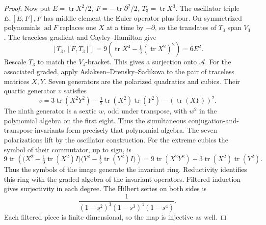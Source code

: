\documentclass[11pt,a4paper]{article}
\theoremstyle{definition}
\begin{document}
\begin{proof}
Now put \(E=\operatorname{tr}X^2/2,\ F=-\operatorname{tr}\partial^2/2,\
T_3=\operatorname{tr}X^3\). The oscillator triple \(E,[E,F],F\) has middle element the Euler operator plus four. On symmetrized polynomials \(\operatorname{ad}F\) replaces one \(X\) at a time by \(-\partial\), so the translates of \(T_3\) span \(V_3\). The traceless gradient and Cayley--Hamilton give
\[
 [T_3,[F,T_3]]
 =9\left(\operatorname{tr}X^4-\tfrac13(\operatorname{tr}X^2)^2\right)=6E^2 .
\]
Rescale \(T_3\) to match the \(V_4\)-bracket. This gives a surjection onto \(\mathcal A\). For the associated graded, apply Aslaksen--Drensky--Sadikova \cite[Thm.~1.2 and (9)]{ADS} to the pair of traceless matrices \(X,Y\). Seven generators are the polarized quadratics and cubics. Their quartic generator \(v\) satisfies
\[
 v=3\operatorname{tr}(X^2Y^2)-\tfrac12\operatorname{tr}(X^2)\operatorname{tr}(Y^2)
    -(\operatorname{tr}(XY))^2 .
\]
The ninth generator is a sextic \(w\), odd under transpose, with \(w^2\) in the polynomial algebra on the first eight. Thus the simultaneous conjugation-and-transpose invariants form precisely that polynomial algebra. The seven polarizations lift by the oscillator construction. For the extreme cubics the symbol of their commutator, up to sign, is
\[
 9\operatorname{tr}\!\left(\big(X^2-\tfrac13\operatorname{tr}(X^2)I\big)
                            \big(Y^2-\tfrac13\operatorname{tr}(Y^2)I\big)\right)
 =9\operatorname{tr}(X^2Y^2)-3\operatorname{tr}(X^2)\operatorname{tr}(Y^2).
\] Thus the symbols of the image generate the invariant ring. Reductivity identifies this ring with the graded algebra of the invariant operators. Filtered induction gives surjectivity in each degree. The Hilbert series on both sides is
\[
 \frac{1}{(1-s^2)^3(1-s^3)^4(1-s^4)} .
\]
Each filtered piece is finite dimensional, so the map is injective as well.
\end{proof}
\end{document}
